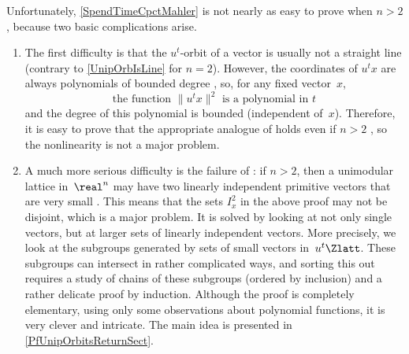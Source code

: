 Unfortunately, \cref{SpendTimeCpctMahler} is not nearly as easy to prove when $n > 2$, because two basic complications arise.
	\begin{enumerate}
	\item The first difficulty is that the $u^t$-orbit of a vector is usually not a straight line (contrary to \cref{UnipOrbIsLine} for $n = 2$). However, the coordinates of $u^t x$ are always polynomials of bounded degree , so, for any fixed vector~$x$, 
	$$ \text{the function $\| u^t x \|^2$ is a polynomial in~$t$} $$
and the degree of this polynomial is bounded (independent of~$x$).
Therefore, it is easy to prove that the appropriate analogue of  holds even if $n > 2$ , so the nonlinearity is not a major problem.

	\item A much more serious difficulty is the failure of : if $n > 2$, then a unimodular lattice in~$\real^n$ may have two  linearly independent primitive vectors that are very small . This means that the sets $I^2_x$ in the above proof may not be disjoint, which is a major problem. It is solved by looking at not only single vectors, but at larger sets of linearly independent vectors. More precisely, we look at the subgroups generated by sets of small vectors in~$u^t \Zlatt$. These subgroups can intersect in rather complicated ways, and sorting this out requires a study of chains of these subgroups (ordered by inclusion) and a rather delicate proof by induction. 
Although the proof is completely elementary, using only some observations about polynomial functions, it is very clever and intricate. The main idea is presented in \cref{PfUnipOrbitsReturnSect}.
	\end{enumerate}


